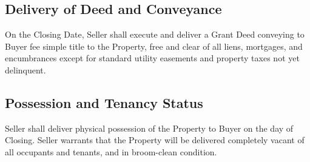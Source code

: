 \subsection{Delivery of Deed and Conveyance}
On the Closing Date, Seller shall execute and deliver a Grant Deed conveying to Buyer fee simple title to the Property, free and clear of all liens, mortgages, and encumbrances except for standard utility easements and property taxes not yet delinquent.

\subsection{Possession and Tenancy Status}
Seller shall deliver physical possession of the Property to Buyer on the day of Closing. Seller warrants that the Property will be delivered completely vacant of all occupants and tenants, and in broom-clean condition.
